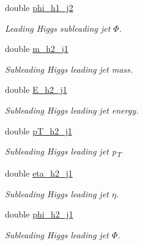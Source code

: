 \begin{DoxyCompactItemize}
double \mbox{\hyperlink{structout__format_a07ee43deac7f1c390e998cc62d385c1b}{phi\+\_\+h1\+\_\+j2}}
\begin{DoxyCompactList}\small\item\em Leading Higgs subleading jet {$\Phi$}. \end{DoxyCompactList}\item 
\mbox{\label{structout__format_a6da0a0497c66daa3d138c84fada15856}} 
double \mbox{\hyperlink{structout__format_a6da0a0497c66daa3d138c84fada15856}{m\+\_\+h2\+\_\+j1}}
\begin{DoxyCompactList}\small\item\em Subleading Higgs leading jet mass. \end{DoxyCompactList}\item 
\mbox{\label{structout__format_a0d498fe05c47134163efce7d9115fcc4}} 
double \mbox{\hyperlink{structout__format_a0d498fe05c47134163efce7d9115fcc4}{E\+\_\+h2\+\_\+j1}}
\begin{DoxyCompactList}\small\item\em Subleading Higgs leading jet energy. \end{DoxyCompactList}\item 
\mbox{\label{structout__format_a2a95690410585f6e242732cc8f05ac75}} 
double \mbox{\hyperlink{structout__format_a2a95690410585f6e242732cc8f05ac75}{p\+T\+\_\+h2\+\_\+j1}}
\begin{DoxyCompactList}\small\item\em Subleading Higgs leading jet p\textsubscript{T} \end{DoxyCompactList}\item 
\mbox{\label{structout__format_ad30fab324dc66c5dd69e80a85fd8e312}} 
double \mbox{\hyperlink{structout__format_ad30fab324dc66c5dd69e80a85fd8e312}{eta\+\_\+h2\+\_\+j1}}
\begin{DoxyCompactList}\small\item\em Subleading Higgs leading jet {$\eta$}. \end{DoxyCompactList}\item 
\mbox{\label{structout__format_a23dffdb0047ec53299c10b6e1a43e2ed}} 
double \mbox{\hyperlink{structout__format_a23dffdb0047ec53299c10b6e1a43e2ed}{phi\+\_\+h2\+\_\+j1}}
\begin{DoxyCompactList}\small\item\em Subleading Higgs leading jet {$\Phi$}. \end{DoxyCompactList}\item 

\end{DoxyCompactItemize}
